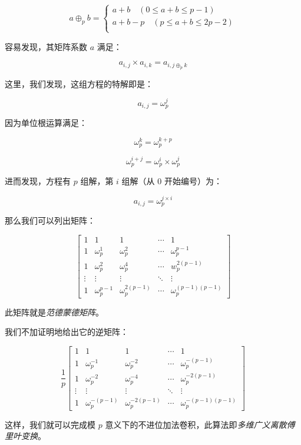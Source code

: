 \documentclass[12pt]{article} %
\begin{document}
$$
a \oplus_p b  =
\left\{
    \begin{array}{l}
        a+b \quad (0 \le a+b \le p-1) \\
        a+b-p \quad (p \le a+b \le 2p-2) \\
    \end{array}
\right.
$$

容易发现，其矩阵系数 $a$ 满足：

$$a_{i,j} \times a_{i,k}=a_{i,j \oplus_p k}$$

这里，我们发现，这组方程的特解即是：

$$a_{i,j} = \omega_{p}^j$$

因为单位根运算满足：

$$\omega_{p}^k = \omega_{p}^{k+p}$$

$$\omega_{p}^{i+j} = \omega_{p}^i \times \omega_{p}^j$$

进而发现，方程有 $p$ 组解，第 $i$ 组解（从 $0$ 开始编号）为：

$$a_{i,j} = \omega_{p}^{j \times i}$$

那么我们可以列出矩阵：

$$
\begin{bmatrix} 1& 1 & 1& \cdots & 1\\ 1& \omega_p^1& \omega_p^2& \cdots & \omega_p^{p - 1}\\ 1& \omega_p^2 & \omega_p^4& \cdots & w_p^{2(p - 1)}\\ \vdots& \vdots& \vdots& \ddots& \vdots\\ 1& \omega_p^{p - 1}& \omega_p^{2(p - 1)} & \cdots & \omega_p^{(p - 1)(p - 1)} \end{bmatrix}
$$

此矩阵就是\textsl{范德蒙德矩阵}。

我们不加证明地给出它的逆矩阵：

$$
\frac 1 p \begin{bmatrix} 1& 1 & 1& \cdots & 1\\ 1& \omega_p^{-1}& \omega_p^{-2}& \cdots & \omega_p^{-(p - 1)}\\ 1& \omega_p^{-2} & \omega_p^{-4}& \cdots & \omega_p^{-2(p - 1)}\\ \vdots& \vdots& \vdots& \ddots& \vdots\\ 1& \omega_p^{-(p - 1)}& \omega_p^{-2(p - 1)} & \cdots & \omega_p^{-(p - 1)(p - 1)} \end{bmatrix}
$$

这样，我们就可以完成模 $p$ 意义下的不进位加法卷积，此算法即\textsl{多维广义离散傅里叶变换}。
\end{document}
